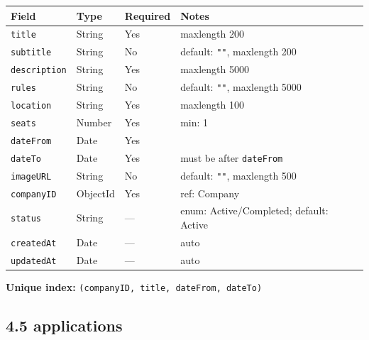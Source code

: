 \documentclass[12pt,a4paper]{article}
\begin{document}
\begin{longtable}{p{3.5cm}p{2.5cm}p{1.8cm}p{5.5cm}}
  \toprule
  \textbf{Field} & \textbf{Type} & \textbf{Required} & \textbf{Notes} \\
  \midrule
  \texttt{title}       & String   & Yes & maxlength 200 \\
  \texttt{subtitle}    & String   & No  & default: \texttt{""}, maxlength 200 \\
  \texttt{description} & String   & Yes & maxlength 5000 \\
  \texttt{rules}       & String   & No  & default: \texttt{""}, maxlength 5000 \\
  \texttt{location}    & String   & Yes & maxlength 100 \\
  \texttt{seats}       & Number   & Yes & min: 1 \\
  \texttt{dateFrom}    & Date     & Yes & \\
  \texttt{dateTo}      & Date     & Yes & must be after \texttt{dateFrom} \\
  \texttt{imageURL}    & String   & No  & default: \texttt{""}, maxlength 500 \\
  \texttt{companyID}   & ObjectId & Yes & ref: Company \\
  \texttt{status}      & String   & — & enum: Active/Completed; default: Active \\
  \texttt{createdAt}   & Date     & — & auto \\
  \texttt{updatedAt}   & Date     & — & auto \\
  \bottomrule
\end{longtable}

\noindent\textbf{Unique index:} \texttt{(companyID, title, dateFrom, dateTo)}

\subsection*{4.5 applications}
\end{document}
